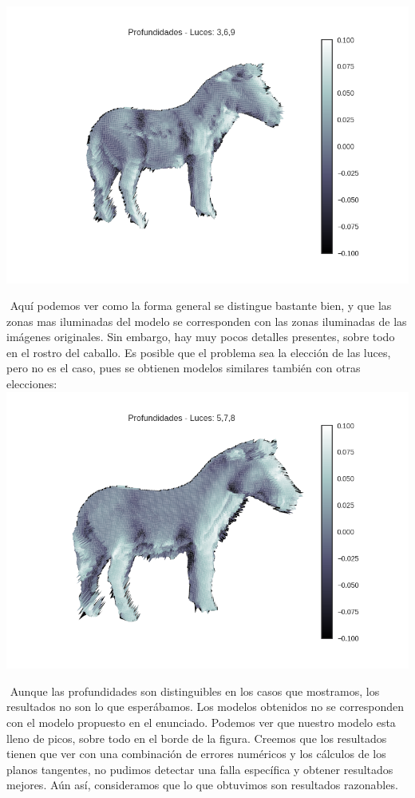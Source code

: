 {\centering
    \includegraphics[width=0.80\linewidth]{informe/imagenes/profundidades/profsCaballo369.png}
}

$ $\newline
Aquí podemos ver como la forma general se distingue bastante bien, y que las zonas mas iluminadas del modelo se corresponden con las zonas iluminadas de las imágenes originales. Sin embargo, hay muy pocos detalles presentes, sobre todo en el rostro del caballo. Es posible que el problema sea la elección de las luces, pero no es el caso, pues se obtienen modelos similares también con otras elecciones: \\

{\centering
    \includegraphics[width=0.80\linewidth]{informe/imagenes/profundidades/profsCaballo578.png}
}


$ $\newline
Aunque las profundidades son distinguibles en los casos que mostramos, los resultados no son lo que esperábamos. Los modelos obtenidos no se corresponden con el modelo propuesto en el enunciado. Podemos ver que nuestro modelo esta lleno de picos, sobre todo en el borde de la figura. Creemos que los resultados tienen que ver con una combinación de errores numéricos y los cálculos de los planos tangentes, no pudimos detectar una falla específica y obtener resultados mejores. Aún así, consideramos que lo que obtuvimos son resultados razonables. \\

